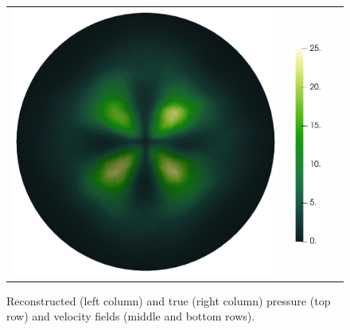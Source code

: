 \begin{figure}[H]
\begin{center}
\begin{tabular}[c]{c c c}
			\includegraphics[scale=.15]{trueVelocity_noglyphs.png} &
			\includegraphics[scale=.18]{velocityColorBar.png}
		\end{tabular}
	\caption{Reconstructed (left column) and true (right column) pressure (top row) and velocity fields (middle and bottom rows).}
	\end{center}
\end{figure}
